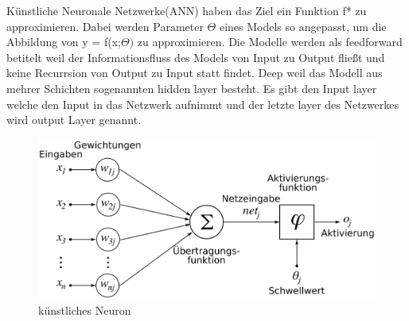 \documentclass{llncs}
\begin{document}
Künstliche Neuronale Netzwerke(ANN) haben das Ziel ein Funktion f* zu approximieren. Dabei werden Parameter $\Theta$ eines Models so angepasst, um die Abbildung von y = f(x;$\Theta)$ zu approximieren. Die Modelle werden als feedforward betitelt weil der Informationsfluss des Models von Input zu Output fließt und keine Recurrsion von Output zu Input statt findet. Deep weil das Modell aus mehrer Schichten sogenannten hidden layer besteht. Es gibt den Input layer welche den Input in das Netzwerk aufnimmt und der letzte layer des Netzwerkes wird output Layer genannt\cite{Grundlagen}. 

\begin{figure}[htbp] 
	\centering
	\includegraphics[width=1.0\textwidth]{Neuron.png}
	\caption{künstliches Neuron}
	\label{fig:Bild1}
\end{figure}
\end{document}

